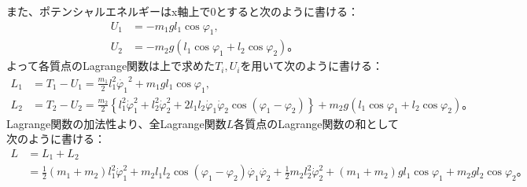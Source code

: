   また、ポテンシャルエネルギーはx軸上で0とすると次のように書ける：
  \begin{align*}
    U_1 &= -m_1gl_1\cos\varphi_1,\\
    U_2 &= -m_2g(l_1\cos\varphi_1 + l_2\cos\varphi_2)。
  \end{align*}
  よって各質点のLagrange関数は上で求めた$T_i,U_i$を用いて次のように書ける：
  \begin{align*}
    L_1 &= T_1 - U_1 = \frac{m_1}{2}l_1^2\dot{\varphi_1}^2 + m_1gl_1\cos\varphi_1,\\
    L_2 &= T_2 - U_2 = \frac{m_2}{2}\left\{l_1^2\dot{\varphi}_1^2 + l_2^2\dot{\varphi}_2^2 + 2l_1l_2\dot{\varphi}_1\dot{\varphi}_2\cos(\varphi_1-\varphi_2)\right\} + m_2g(l_1\cos\varphi_1 + l_2\cos\varphi_2)。
  \end{align*}
  Lagrange関数の加法性より、全Lagrange関数$L$各質点のLagrange関数の和として次のように書ける：
  \begin{align*}
    L &= L_1 + L_2\\
    &= \frac{1}{2}(m_1 + m_2)l_1^2\dot{\varphi}_1^2   + m_2l_1l_2\cos(\varphi_1-\varphi_2)\dot{\varphi_1}\dot{\varphi_2} + \frac{1}{2}m_2l_2^2\dot{\varphi}_2^2 + (m_1 + m_2)gl_1\cos\varphi_1 + m_2gl_2\cos\varphi_2 \tag{1}。
  \end{align*}
